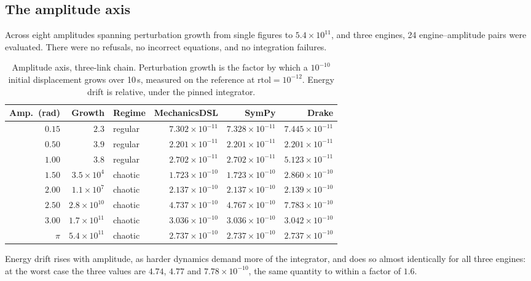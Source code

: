 \documentclass[review,12pt]{elsarticle}
\begin{document}
\subsection{The amplitude axis}
Across eight amplitudes spanning perturbation growth from single figures to
$5.4\times10^{11}$, and three engines, 24 engine--amplitude pairs were
evaluated. There were no refusals, no incorrect equations, and no integration
failures.

\begin{table}[!htbp]
\centering
\caption{Amplitude axis, three-link chain. Perturbation growth is the factor by
which a $10^{-10}$ initial displacement grows over 10\,s, measured on the
reference at $\mathrm{rtol}=10^{-12}$. Energy drift is relative, under the
pinned integrator.}
\label{tab:amplitude}
\footnotesize
\setlength{\tabcolsep}{3.5pt}
\begin{tabular}{@{}rrlrrr@{}}
\toprule
\textbf{Amp.\ (rad)} & \textbf{Growth} & \textbf{Regime} & \textbf{MechanicsDSL} & \textbf{SymPy} & \textbf{Drake} \\
\midrule
$0.15$   & $2.3$                & regular & $7.302\times10^{-11}$ & $7.328\times10^{-11}$ & $7.445\times10^{-11}$ \\
$0.50$   & $3.9$                & regular & $2.201\times10^{-11}$ & $2.201\times10^{-11}$ & $2.201\times10^{-11}$ \\
$1.00$   & $3.8$                & regular & $2.702\times10^{-11}$ & $2.702\times10^{-11}$ & $5.123\times10^{-11}$ \\
$1.50$   & $3.5\times10^{4}$    & chaotic & $1.723\times10^{-10}$ & $1.723\times10^{-10}$ & $2.860\times10^{-10}$ \\
$2.00$   & $1.1\times10^{7}$    & chaotic & $2.137\times10^{-10}$ & $2.137\times10^{-10}$ & $2.139\times10^{-10}$ \\
$2.50$   & $2.8\times10^{10}$   & chaotic & $4.737\times10^{-10}$ & $4.767\times10^{-10}$ & $7.783\times10^{-10}$ \\
$3.00$   & $1.7\times10^{11}$   & chaotic & $3.036\times10^{-10}$ & $3.036\times10^{-10}$ & $3.042\times10^{-10}$ \\
$\pi$    & $5.4\times10^{11}$   & chaotic & $2.737\times10^{-10}$ & $2.737\times10^{-10}$ & $2.737\times10^{-10}$ \\
\bottomrule
\end{tabular}
\end{table}

Energy drift rises with amplitude, as harder dynamics demand more of the
integrator, and does so almost identically for all three engines: at the worst
case the three values are $4.74$, $4.77$ and $7.78\times10^{-10}$, the same
quantity to within a factor of $1.6$.
\end{document}
